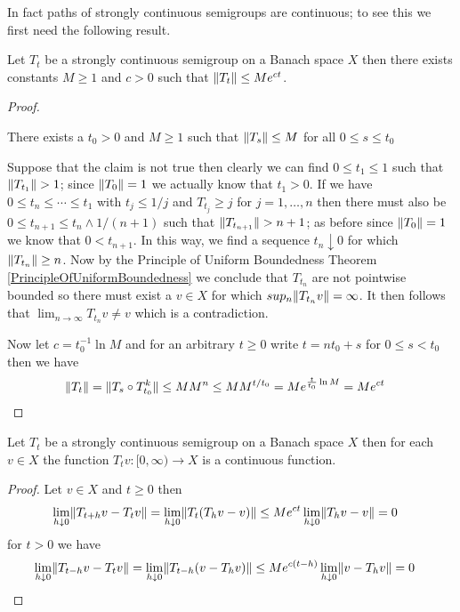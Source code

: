 In fact paths of strongly continuous semigroups are continuous; to see this we first need the following result.
\begin{lem}\label{StronglyContinuousSemigroupNormBound}Let $T_t$ be a strongly continuous semigroup on a Banach space $X$ then there exists constants $M \geq 1$ and $c > 0$ such that 
$\lVert T_t \rVert \leq M e^{ct}$.
\end{lem}
\begin{proof}
\begin{clm}There exists a $t_0 > 0$ and $M \geq 1$ such that $\lVert T_s \rVert \leq M$ for all $0 \leq s \leq t_0$
\end{clm}
Suppose that the claim is not true then clearly we can find $0 \leq t_1 \leq 1$ such that $\lVert T_{t_1} \rVert > 1$; since $\lVert T_0 \rVert = 1$ we actually know that $t_1 > 0$.  If we have $0 \leq t_n \leq \dotsb \leq t_1$ with $t_j \leq 1/j$ and $T_{t_j} \geq j$ for $j=1, \dotsc, n$ then there must also be $0 \leq t_{n+1} \leq t_{n} \wedge 1/(n+1)$ such that $\lVert T_{t_{n+1}} \rVert > n+1$; as before since $\lVert T_0 \rVert = 1$ we know that $0 < t_{n+1}$.  In this way,  we find a sequence $t_n \downarrow 0$ for which $\lVert T_{t_n} \rVert \geq n$.  Now by the Principle of Uniform Boundedness Theorem \ref{PrincipleOfUniformBoundedness} we conclude that $T_{t_n}$ are not pointwise bounded so there must exist a $v \in X$ for which $sup_n \lVert T_{t_n} v \rVert = \infty$.  It then follows that $\lim_{n \to \infty} T_{t_n} v \neq v$ which is a contradiction.

Now let $c = t_0^{-1} \ln M$ and for an arbitrary $t \geq 0$ write $t = n t_0 + s$ for $0 \leq s < t_0$ then we have
\begin{align*}
\lVert T_t \rVert &= \lVert T_s \circ T_{t_0}^k \rVert \leq M M^{n} \leq M M^{t/t_0} = M e^{\frac{t}{t_0} \ln M} = M e^{ct}
\end{align*}
\end{proof}

\begin{prop}\label{StronglyContinuousSemigroupContinuousPaths}Let $T_t$ be a strongly continuous semigroup on a Banach space $X$ then for each $v \in X$ the function $T_t v : [0,\infty) \to X$ is a continuous function.
\end{prop}
\begin{proof}
Let $v \in X$ and $t \geq 0$ then 
\begin{align*}
\lim_{h \downarrow 0} \lVert T_{t+h} v - T_t v \rVert &= \lim_{h \downarrow 0} \lVert T_{t}(T_hv - v) \rVert \leq M e^{ct} \lim_{h \downarrow 0}\lVert T_h v - v \rVert = 0
\end{align*}
for $t > 0$ we have
\begin{align*}
\lim_{h \downarrow 0} \lVert T_{t-h} v - T_t v \rVert &= \lim_{h \downarrow 0} \lVert T_{t-h}(v - T_hv) \rVert \leq M e^{c(t-h)} \lim_{h \downarrow 0}\lVert v - T_h v \rVert = 0
\end{align*}
\end{proof}

